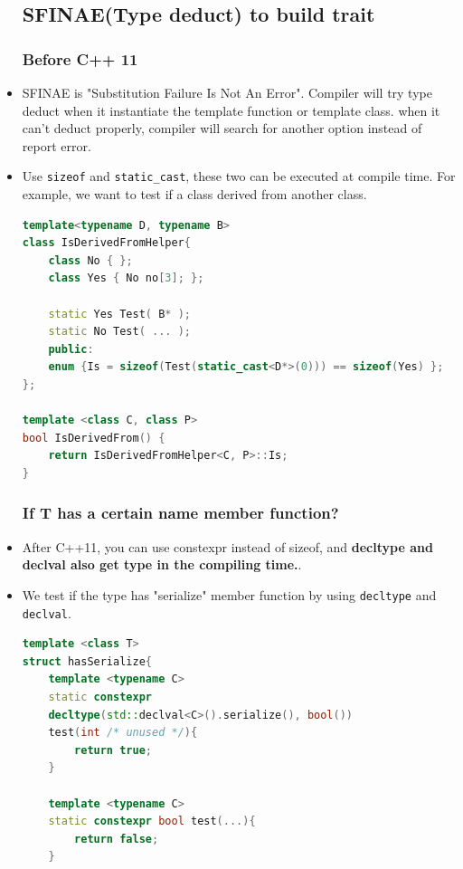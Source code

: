 \documentclass[a4paper,11pt,twoside]{book}
\begin{document}
\begin{itemize}
\subsection{SFINAE(Type deduct) to build trait}
\subsubsection{Before C++ 11}

	\item SFINAE is "Substitution Failure Is Not An Error". Compiler will try type deduct when it instantiate the template function or template class. when it can't deduct properly, compiler will search for another option instead of report error. 
	
	\item Use \texttt{sizeof} and \texttt{static\_cast}, these two can be executed at compile time. For example, we want to test if a class derived from another class.
\begin{lstlisting}[frame=single, language=c++]
template<typename D, typename B>
class IsDerivedFromHelper{
	class No { };
	class Yes { No no[3]; };
	
	static Yes Test( B* );
	static No Test( ... );
	public:
	enum {Is = sizeof(Test(static_cast<D*>(0))) == sizeof(Yes) };
};
	
template <class C, class P> 
bool IsDerivedFrom() {
	return IsDerivedFromHelper<C, P>::Is;
}
\end{lstlisting}

\subsubsection{If T has a certain name member function?}
	
	\item After C++11, you can use constexpr instead of sizeof, and \textbf{decltype and declval also get type in the compiling time.}. 
	
	
	\item We test if the type has "serialize" member function by using \texttt{decltype} and \texttt{declval}.
	
\begin{lstlisting}[frame=single, language=c++]
template <class T> 
struct hasSerialize{
	template <typename C>
	static constexpr 
	decltype(std::declval<C>().serialize(), bool())
	test(int /* unused */){
		return true;
	}

	template <typename C>
	static constexpr bool test(...){
		return false;
	}
	

\end{lstlisting}
\end{itemize}
\end{document}
